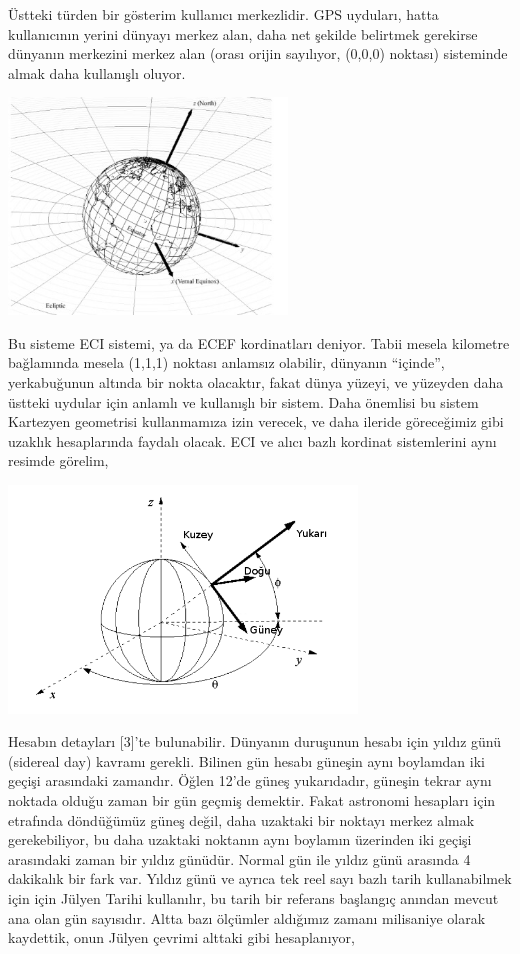\documentclass[12pt,fleqn]{article}\usepackage{../../common}
\begin{document}
Üstteki türden bir gösterim kullanıcı merkezlidir. GPS uyduları, hatta
kullanıcının yerini dünyayı merkez alan, daha net şekilde belirtmek
gerekirse dünyanın merkezini merkez alan (orası orijin sayılıyor, (0,0,0)
noktası) sisteminde almak daha kullanışlı oluyor.

\includegraphics[width=20em]{eci.jpg}

Bu sisteme ECI sistemi, ya da ECEF kordinatları deniyor. Tabii mesela
kilometre bağlamında mesela (1,1,1) noktası anlamsız olabilir, dünyanın
``içinde'', yerkabuğunun altında bir nokta olacaktır, fakat dünya yüzeyi,
ve yüzeyden daha üstteki uydular için anlamlı ve kullanışlı bir
sistem. Daha önemlisi bu sistem Kartezyen geometrisi kullanmamıza izin
verecek, ve daha ileride göreceğimiz gibi uzaklık hesaplarında faydalı
olacak. ECI ve alıcı bazlı kordinat sistemlerini aynı resimde görelim,

\includegraphics[width=25em]{ecef_topo.png}

Hesabın detayları [3]'te bulunabilir. Dünyanın duruşunun hesabı için yıldız
günü (sidereal day) kavramı gerekli. Bilinen gün hesabı güneşin aynı
boylamdan iki geçişi arasındaki zamandır. Öğlen 12'de güneş yukarıdadır,
güneşin tekrar aynı noktada olduğu zaman bir gün geçmiş demektir. Fakat
astronomi hesapları için etrafında döndüğümüz güneş değil, daha uzaktaki
bir noktayı merkez almak gerekebiliyor, bu daha uzaktaki noktanın aynı
boylamın üzerinden iki geçişi arasındaki zaman bir yıldız günüdür. Normal
gün ile yıldız günü arasında 4 dakikalık bir fark var. Yıldız günü ve
ayrıca tek reel sayı bazlı tarih kullanabilmek için için Jülyen Tarihi
kullanılır, bu tarih bir referans başlangıç anından mevcut ana olan gün
sayısıdır. Altta bazı ölçümler aldığımız zamanı milisaniye olarak
kaydettik, onun Jülyen çevrimi alttaki gibi hesaplanıyor,
\end{document}
